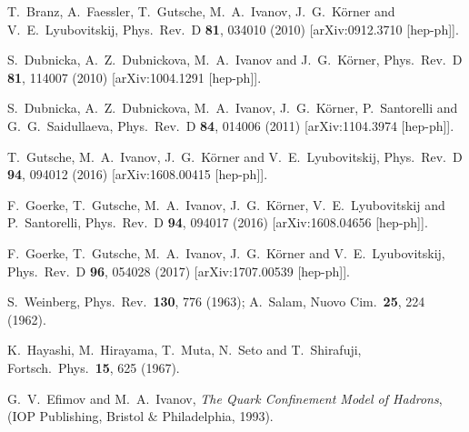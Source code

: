 \documentclass[aps,prd,floatfix,superscriptaddress,showpacs,showkeys]{revtex4}
\begin{document}
\begin{thebibliography}{99}
  T.~Branz, A.~Faessler, T.~Gutsche, M.~A.~Ivanov, J.~G.~K\"orner 
  and V.~E.~Lyubovitskij,  
  Phys.\ Rev.\ D {\bf 81}, 034010 (2010) 
  [arXiv:0912.3710 [hep-ph]].

  S.~Dubnicka, A.~Z.~Dubnickova, M.~A.~Ivanov and J.~G.~K\"orner,
  Phys.\ Rev.\ D {\bf 81}, 114007 (2010) 
  [arXiv:1004.1291 [hep-ph]].

  S.~Dubnicka, A.~Z.~Dubnickova, M.~A.~Ivanov, J.~G.~K\"orner, 
 P.~Santorelli and G.~G.~Saidullaeva,
  Phys.\ Rev.\ D {\bf 84}, 014006 (2011) 
  [arXiv:1104.3974 [hep-ph]].

  T.~Gutsche, M.~A.~Ivanov, J.~G.~K\"orner and V.~E.~Lyubovitskij,
  Phys.\ Rev.\ D {\bf 94}, 094012 (2016) 
  [arXiv:1608.00415 [hep-ph]].

  F.~Goerke, T.~Gutsche, M.~A.~Ivanov, J.~G.~K\"orner, V.~E.~Lyubovitskij 
  and P.~Santorelli,
  Phys.\ Rev.\ D {\bf 94}, 094017 (2016)  
  [arXiv:1608.04656 [hep-ph]].

  F.~Goerke, T.~Gutsche, M.~A.~Ivanov, J.~G.~K\"orner and V.~E.~Lyubovitskij,
  Phys.\ Rev.\ D {\bf 96}, 054028 (2017)
  [arXiv:1707.00539 [hep-ph]]. 

  S.~Weinberg,
  Phys.\ Rev.\  {\bf 130}, 776 (1963); 
  A.~Salam,
  Nuovo Cim.\  {\bf 25}, 224 (1962). 

  K.~Hayashi, M.~Hirayama, T.~Muta, N.~Seto and T.~Shirafuji,
  Fortsch.\ Phys.\ {\bf 15}, 625 (1967).

  G.~V.~Efimov and M.~A.~Ivanov,
  {\it The Quark Confinement Model of Hadrons},
  (IOP Publishing, Bristol $\&$ Philadelphia, 1993).


\end{thebibliography}
\end{document}
